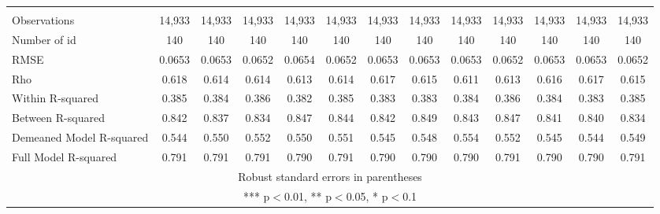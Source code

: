 \documentclass[]{article}
\begin{document}
\begin{sidewaystable}
{\begin{tabular}{lcccccccccccc}
 &  &  &  &  &  &  &  &  &  &  &  &  \\
Observations & 14,933 & 14,933 & 14,933 & 14,933 & 14,933 & 14,933 & 14,933 & 14,933 & 14,933 & 14,933 & 14,933 & 14,933 \\
Number of id & 140 & 140 & 140 & 140 & 140 & 140 & 140 & 140 & 140 & 140 & 140 & 140 \\
RMSE & 0.0653 & 0.0653 & 0.0652 & 0.0654 & 0.0652 & 0.0653 & 0.0653 & 0.0653 & 0.0652 & 0.0653 & 0.0653 & 0.0652 \\
Rho & 0.618 & 0.614 & 0.614 & 0.613 & 0.614 & 0.617 & 0.615 & 0.611 & 0.613 & 0.616 & 0.617 & 0.615 \\
Within R-squared & 0.385 & 0.384 & 0.386 & 0.382 & 0.385 & 0.383 & 0.383 & 0.384 & 0.386 & 0.384 & 0.383 & 0.385 \\
Between R-squared & 0.842 & 0.837 & 0.834 & 0.847 & 0.844 & 0.842 & 0.849 & 0.843 & 0.847 & 0.841 & 0.840 & 0.834 \\
Demeaned Model R-squared & 0.544 & 0.550 & 0.552 & 0.550 & 0.551 & 0.545 & 0.548 & 0.554 & 0.552 & 0.545 & 0.544 & 0.549 \\
 Full Model R-squared & 0.791 & 0.791 & 0.791 & 0.790 & 0.791 & 0.790 & 0.790 & 0.790 & 0.791 & 0.790 & 0.790 & 0.791 \\ \hline
\multicolumn{13}{c}{ Robust standard errors in parentheses} \\
\multicolumn{13}{c}{ *** p$<$0.01, ** p$<$0.05, * p$<$0.1} \\
\end{tabular}}
\end{sidewaystable}
\end{document}
